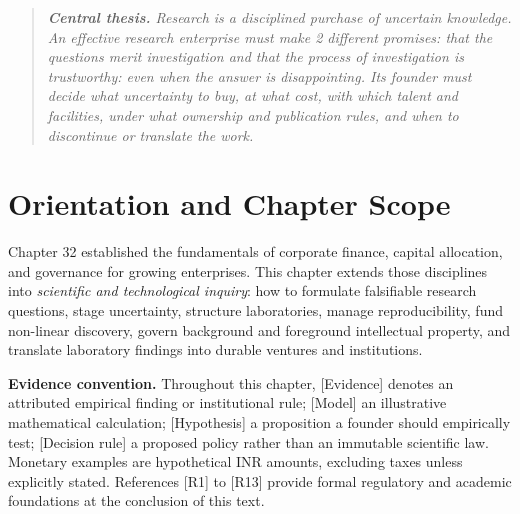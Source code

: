 
\begin{quote}
\itshape
\textbf{Central thesis.} Research is a disciplined purchase of uncertain knowledge. An effective research enterprise must make 2 different promises: that the questions merit investigation and that the process of investigation is trustworthy: even when the answer is disappointing. Its founder must decide what uncertainty to buy, at what cost, with which talent and facilities, under what ownership and publication rules, and when to discontinue or translate the work.
\end{quote}

\section*{Orientation and Chapter Scope}

Chapter 32 established the fundamentals of corporate finance, capital allocation, and governance for growing enterprises. This chapter extends those disciplines into \textit{scientific and technological inquiry}: how to formulate falsifiable research questions, stage uncertainty, structure laboratories, manage reproducibility, fund non-linear discovery, govern background and foreground intellectual property, and translate laboratory findings into durable ventures and institutions.

\textbf{Evidence convention.} Throughout this chapter, [Evidence] denotes an attributed empirical finding or institutional rule; [Model] an illustrative mathematical calculation; [Hypothesis] a proposition a founder should empirically test; [Decision rule] a proposed policy rather than an immutable scientific law. Monetary examples are hypothetical INR amounts, excluding taxes unless explicitly stated. References [R1] to [R13] provide formal regulatory and academic foundations at the conclusion of this text.

